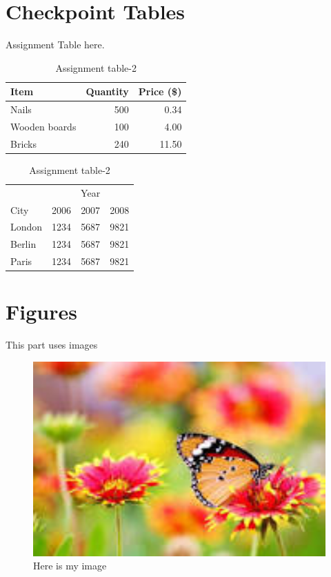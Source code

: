 \documentclass[a4paper,12pt]{article}
\begin{document}
\section{Checkpoint Tables}
Assignment Table here.
{\begin{table}[ht]
\caption{Assignment table-1}
\center
\begin{tabular}{l|r|r}
Item & Quantity & Price (\$) \\
\hline
Nails & 500 & 0.34\\
Wooden boards & 100 & 4.00\\
Bricks & 240 & 11.50\\
\end{tabular}
\vspace{12pt}

\caption{Assignment table-2}
\begin{tabular}{l|ccc}
 & & Year &\\
\cline{2-4}
City & 2006 & 2007 & 2008\\
\hline
London & 1234 & 5687 & 9821\\
Berlin & 1234 & 5687 & 9821\\
Paris & 1234 & 5687 & 9821\\
\end{tabular}
\end{table}

\newpage

\section{Figures}
This part uses images\newline
\begin{figure}[h!]
\centering
\includegraphics[width=1\textwidth]{myimage}
\caption{Here is my image}
\label{image-myimage}
\end{figure}

}
\end{document}
